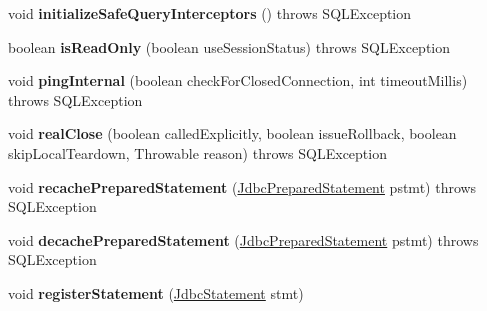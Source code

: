 \begin{DoxyCompactItemize}
\mbox{\label{interfacecom_1_1mysql_1_1cj_1_1jdbc_1_1_jdbc_connection_a48b2a3226fefc00bf09985a66da96d90}} 
void {\bfseries initialize\+Safe\+Query\+Interceptors} ()  throws S\+Q\+L\+Exception
\item 
\mbox{\label{interfacecom_1_1mysql_1_1cj_1_1jdbc_1_1_jdbc_connection_ac4815b01cd9176630cbab2941bec0ce4}} 
boolean {\bfseries is\+Read\+Only} (boolean use\+Session\+Status)  throws S\+Q\+L\+Exception
\item 
\mbox{\label{interfacecom_1_1mysql_1_1cj_1_1jdbc_1_1_jdbc_connection_a25615f355be83a136df2efcde168666c}} 
void {\bfseries ping\+Internal} (boolean check\+For\+Closed\+Connection, int timeout\+Millis)  throws S\+Q\+L\+Exception
\item 
\mbox{\label{interfacecom_1_1mysql_1_1cj_1_1jdbc_1_1_jdbc_connection_af5f24cb10cfc14e0174c6bb115745bc0}} 
void {\bfseries real\+Close} (boolean called\+Explicitly, boolean issue\+Rollback, boolean skip\+Local\+Teardown, Throwable reason)  throws S\+Q\+L\+Exception
\item 
\mbox{\label{interfacecom_1_1mysql_1_1cj_1_1jdbc_1_1_jdbc_connection_a24f00ff038a4f01aab9dea9e2817c084}} 
void {\bfseries recache\+Prepared\+Statement} (\mbox{\hyperlink{interfacecom_1_1mysql_1_1cj_1_1jdbc_1_1_jdbc_prepared_statement}{Jdbc\+Prepared\+Statement}} pstmt)  throws S\+Q\+L\+Exception
\item 
\mbox{\label{interfacecom_1_1mysql_1_1cj_1_1jdbc_1_1_jdbc_connection_abf867252ec91eb8d6ed6ec4fb34b2686}} 
void {\bfseries decache\+Prepared\+Statement} (\mbox{\hyperlink{interfacecom_1_1mysql_1_1cj_1_1jdbc_1_1_jdbc_prepared_statement}{Jdbc\+Prepared\+Statement}} pstmt)  throws S\+Q\+L\+Exception
\item 
\mbox{\label{interfacecom_1_1mysql_1_1cj_1_1jdbc_1_1_jdbc_connection_ae2bd1cf8c944f811560e419b9fcefc91}} 
void {\bfseries register\+Statement} (\mbox{\hyperlink{interfacecom_1_1mysql_1_1cj_1_1jdbc_1_1_jdbc_statement}{Jdbc\+Statement}} stmt)

\end{DoxyCompactItemize}
